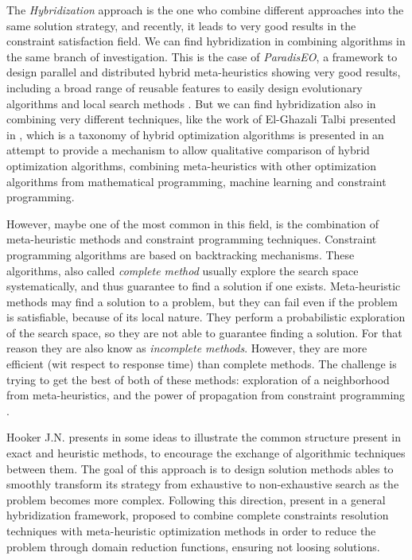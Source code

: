 The \textit{Hybridization} approach is the one who combine different approaches into the same solution strategy, and recently, it leads to very good results in the constraint satisfaction field. We can find hybridization in combining algorithms in the same branch of investigation. This is the case of {\it ParadisEO}, a framework to design parallel and distributed hybrid meta-heuristics showing very good results, including a broad range of reusable features to easily design evolutionary algorithms and local search methods \cite{Cahon2004}. But we can find hybridization also in combining very different techniques, like the work of El-Ghazali Talbi presented in \cite{El-Ghazali2013}, which is a taxonomy of hybrid optimization algorithms is presented in an attempt to provide a mechanism to allow qualitative comparison of hybrid optimization algorithms, combining meta-heuristics with other optimization algorithms from mathematical programming, machine learning and constraint programming.

However, maybe one of the most common in this field, is the combination of meta-heuristic methods and constraint programming techniques. Constraint programming algorithms are based on backtracking mechanisms. These algorithms, also called {\it complete method} usually explore the search space systematically, and thus guarantee to find a solution if one exists. Meta-heuristic methods may find a solution to a problem, but they can fail even if the problem is satisfiable, because of its local nature. They perform a probabilistic exploration of the search space, so they are not able to guarantee finding a solution. For that reason they are also know as {\it incomplete methods}. However, they are more efficient (wit respect to response time) than complete methods. The challenge is trying to get the best of both of these methods: exploration of a neighborhood from meta-heuristics, and the power of propagation from constraint programming \cite{Jussien2002,Pesant1996,Shaw1998}.

Hooker J.N. presents in \cite{Hooker2012} some ideas to illustrate the common structure present in exact and heuristic methods, to encourage the exchange of algorithmic techniques between them. The goal of this approach is to design solution methods ables to smoothly transform its strategy from exhaustive to non-exhaustive search as the problem becomes more complex. Following this direction,  present in \cite{Monfroya,Monfroyb} a general hybridization framework, proposed to combine complete constraints resolution techniques with meta-heuristic optimization methods in order to reduce the problem through domain reduction functions, ensuring not loosing solutions. 


